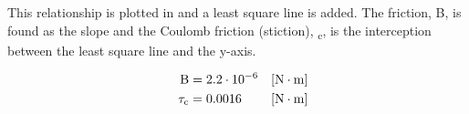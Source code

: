 This relationship is plotted in  and a least square line is added. The friction, B, is found as the slope and the Coulomb friction (stiction), \si{\tau_c}, is the interception between the least square line and the y-axis.

\begin{align}
  \eq{B}{\num{2,2}\cdot 10^{-6}} \unit{N\cdot m}\nonumber\\
  \eq{\tau_c}{\num{0.0016}} \unit{N\cdot m}\nonumber
\end{align}